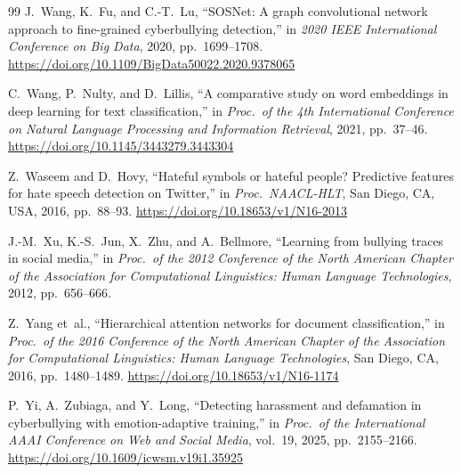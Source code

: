 \documentclass[10pt,twocolumn,a4paper]{article}
\begin{document}
\begin{thebibliography}{99}
J.~Wang, K.~Fu, and C.-T.~Lu, ``SOSNet: A graph convolutional network approach to fine-grained cyberbullying detection,'' in \textit{2020 IEEE International Conference on Big Data}, 2020, pp.~1699--1708. \url{https://doi.org/10.1109/BigData50022.2020.9378065}

C.~Wang, P.~Nulty, and D.~Lillis, ``A comparative study on word embeddings in deep learning for text classification,'' in \textit{Proc.\ of the 4th International Conference on Natural Language Processing and Information Retrieval}, 2021, pp.~37--46. \url{https://doi.org/10.1145/3443279.3443304}

Z.~Waseem and D.~Hovy, ``Hateful symbols or hateful people? Predictive features for hate speech detection on Twitter,'' in \textit{Proc.\ NAACL-HLT}, San Diego, CA, USA, 2016, pp.~88--93. \url{https://doi.org/10.18653/v1/N16-2013}

J.-M.~Xu, K.-S.~Jun, X.~Zhu, and A.~Bellmore, ``Learning from bullying traces in social media,'' in \textit{Proc.\ of the 2012 Conference of the North American Chapter of the Association for Computational Linguistics: Human Language Technologies}, 2012, pp.~656--666.

Z.~Yang et~al., ``Hierarchical attention networks for document classification,'' in \textit{Proc.\ of the 2016 Conference of the North American Chapter of the Association for Computational Linguistics: Human Language Technologies}, San Diego, CA, 2016, pp.~1480--1489. \url{https://doi.org/10.18653/v1/N16-1174}

P.~Yi, A.~Zubiaga, and Y.~Long, ``Detecting harassment and defamation in cyberbullying with emotion-adaptive training,'' in \textit{Proc.\ of the International AAAI Conference on Web and Social Media}, vol.~19, 2025, pp.~2155--2166. \url{https://doi.org/10.1609/icwsm.v19i1.35925}

\end{thebibliography}
\end{document}
